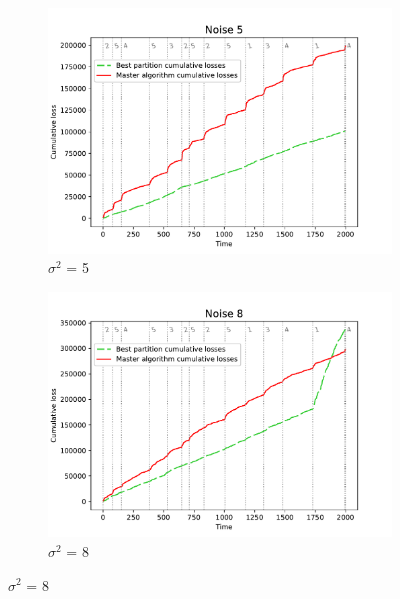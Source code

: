 \documentclass[12pt, twoside]{article}
\begin{document}
\begin{figure}[htb]
\begin{subfigure}{0.49\textwidth}
  \includegraphics[width=\linewidth]{dec_noise_5}
  \caption{$\sigma^2$ = 5}
  \label{fig:n_5}
\end{subfigure}
\begin{subfigure}{0.49\textwidth}
  \includegraphics[width=\linewidth]{dec_noise_8}
  \caption{$\sigma^2$ = 8}
  \label{fig:n_8}
\end{subfigure}\hfil %


\end{figure}
\end{document}
